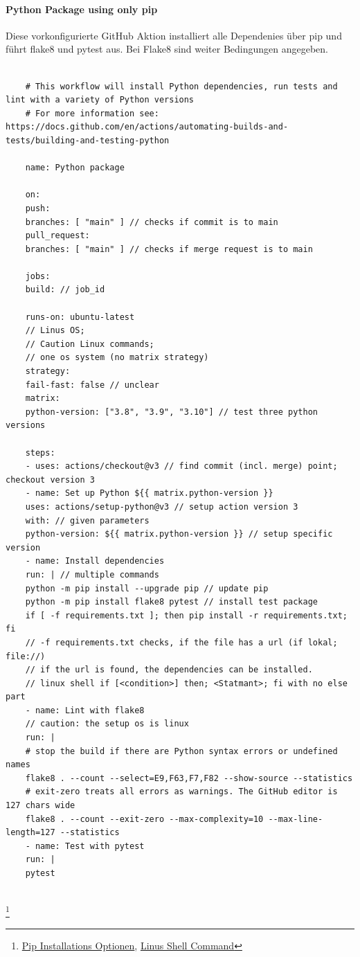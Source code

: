 \paragraph{Python Package using only pip}
Diese vorkonfigurierte GitHub Aktion installiert alle Dependenies über pip und führt flake8 und pytest aus. Bei Flake8 sind weiter Bedingungen angegeben.

\begin{lstlisting}[style=Config, caption={GitHub Action Temple: Python Package create and test with conda}, captionpos=b]
	
	# This workflow will install Python dependencies, run tests and lint with a variety of Python versions
	# For more information see: https://docs.github.com/en/actions/automating-builds-and-tests/building-and-testing-python
	
	name: Python package
	
	on:
	push:
	branches: [ "main" ] // checks if commit is to main 
	pull_request:
	branches: [ "main" ] // checks if merge request is to main
	
	jobs:
	build: // job_id
	
	runs-on: ubuntu-latest 
	// Linus OS;
	// Caution Linux commands; 
	// one os system (no matrix strategy)
	strategy:
	fail-fast: false // unclear
	matrix:
	python-version: ["3.8", "3.9", "3.10"] // test three python versions
	
	steps:
	- uses: actions/checkout@v3 // find commit (incl. merge) point; checkout version 3
	- name: Set up Python ${{ matrix.python-version }} 
	uses: actions/setup-python@v3 // setup action version 3
	with: // given parameters
	python-version: ${{ matrix.python-version }} // setup specific version
	- name: Install dependencies
	run: | // multiple commands
	python -m pip install --upgrade pip // update pip
	python -m pip install flake8 pytest // install test package
	if [ -f requirements.txt ]; then pip install -r requirements.txt; fi
	// -f requirements.txt checks, if the file has a url (if lokal; file://)
	// if the url is found, the dependencies can be installed.
	// linux shell if [<condition>] then; <Statmant>; fi with no else part
	- name: Lint with flake8
	// caution: the setup os is linux
	run: |
	# stop the build if there are Python syntax errors or undefined names
	flake8 . --count --select=E9,F63,F7,F82 --show-source --statistics
	# exit-zero treats all errors as warnings. The GitHub editor is 127 chars wide
	flake8 . --count --exit-zero --max-complexity=10 --max-line-length=127 --statistics
	- name: Test with pytest
	run: |
	pytest
	
\end{lstlisting}
\footnote{
	\href{https://pip.pypa.io/en/stable/cli/pip_install/}{Pip Installations Optionen},
	\href{https://www.tutorialspoint.com/unix/if-fi-statement.htm}{Linus Shell Command} 
}


